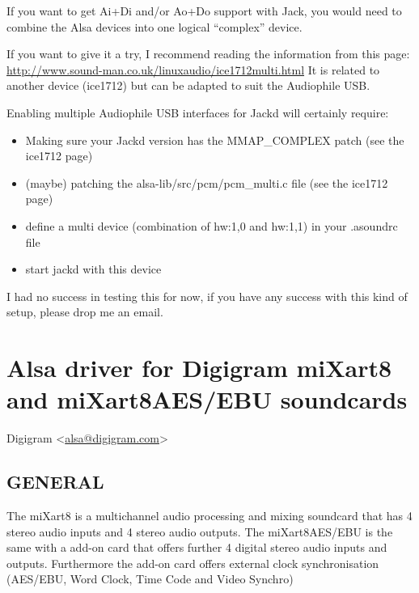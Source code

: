 \documentclass[a4paper,8pt,english]{sphinxmanual}
\begin{document}
If you want to get Ai+Di and/or Ao+Do support with Jack, you would need to
combine the Alsa devices into one logical ``complex'' device.

If you want to give it a try, I recommend reading the information from
this page: \href{http://www.sound-man.co.uk/linuxaudio/ice1712multi.html}{http://www.sound-man.co.uk/linuxaudio/ice1712multi.html}
It is related to another device (ice1712) but can be adapted to suit
the Audiophile USB.

Enabling multiple Audiophile USB interfaces for Jackd will certainly require:
\begin{itemize}
\item {} 
Making sure your Jackd version has the MMAP\_COMPLEX patch (see the ice1712 page)

\item {} 
(maybe) patching the alsa-lib/src/pcm/pcm\_multi.c file (see the ice1712 page)

\item {} 
define a multi device (combination of hw:1,0 and hw:1,1) in your .asoundrc
file

\item {} 
start jackd with this device

\end{itemize}

I had no success in testing this for now, if you have any success with this kind
of setup, please drop me an email.


\section{Alsa driver for Digigram miXart8 and miXart8AES/EBU soundcards}
\label{sound/cards/mixart:alsa-driver-for-digigram-mixart8-and-mixart8aes-ebu-soundcards}\label{sound/cards/mixart::doc}
Digigram \textless{}\href{mailto:alsa@digigram.com}{alsa@digigram.com}\textgreater{}


\subsection{GENERAL}
\label{sound/cards/mixart:general}
The miXart8 is a multichannel audio processing and mixing soundcard
that has 4 stereo audio inputs and 4 stereo audio outputs.
The miXart8AES/EBU is the same with a add-on card that offers further
4 digital stereo audio inputs and outputs.
Furthermore the add-on card offers external clock synchronisation
(AES/EBU, Word Clock, Time Code and Video Synchro)
\end{document}
